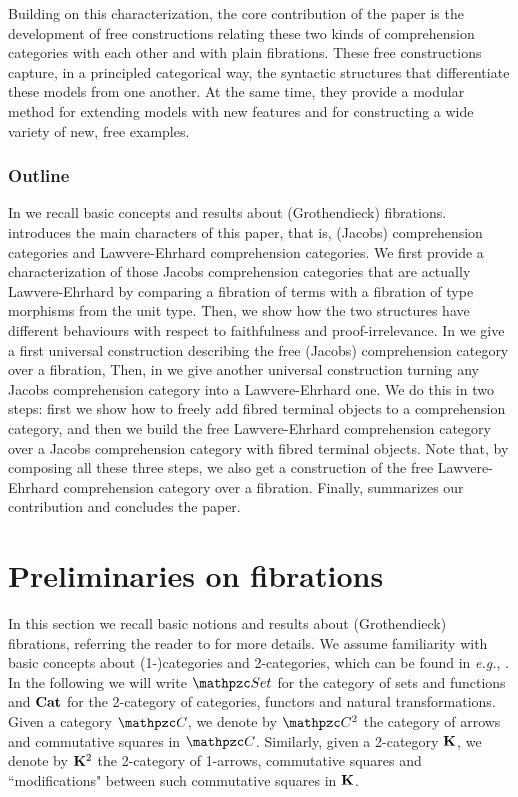 \documentclass{lmcs} %
\theoremstyle{plain}\newtheorem{satz}[thm]{Satz} %
\def\eg{{\em e.g.}}
\begin{document}
Building on this characterization, the core contribution of the paper is the development of free constructions relating these two kinds of comprehension categories with each other and with plain fibrations. These free constructions capture, in a principled categorical way, the syntactic structures that differentiate these models from one another. At the same time, they provide a modular method for extending models with new features and for constructing a wide variety of new, free examples.

\subsubsection*{Outline} 
In  we recall basic concepts and results about (Grothendieck) fibrations. 
% 
 introduces the main characters of this paper, that is, (Jacobs) comprehension categories and Lawvere-Ehrhard comprehension categories. 
We first provide a characterization of those Jacobs comprehension categories that are actually Lawvere-Ehrhard  by comparing a fibration of terms with a fibration of type morphisms from the unit type. 
Then, we show how the two structures have different behaviours with respect to faithfulness and proof-irrelevance. 
% 
In  
we give a first universal construction 
describing the free (Jacobs) comprehension category over a fibration, 
Then, in  we give another universal construction turning any Jacobs comprehension category into a Lawvere-Ehrhard one. 
We do this in two steps: 
first we show how to freely add fibred terminal objects to a comprehension category, and 
then we build the free Lawvere-Ehrhard comprehension category over a Jacobs  comprehension category with fibred terminal objects. 
Note that, 
by composing all these three steps, we also get a construction of the free Lawvere-Ehrhard comprehension category over a fibration. 
%
Finally,  summarizes our contribution and concludes the paper. 



\section{Preliminaries on fibrations}\label{sect:prelim}

In this section we recall basic notions and results about (Grothendieck) fibrations, referring the reader to \cite{StreicherT:fibc} for more details. 
We assume familiarity with basic  concepts about (1-)categories and 2-categories, which can be found  in \eg, \cite{kelly2006review, johnson20212, riehl2017category}.
In the following we will write $\ctset$ for the category of sets and functions and $\mathbf{Cat}$ for the 2-category of categories, functors and natural transformations.
Given a category $\ct{C}$, we denote by $\Arr{\ct{C}}$ the category of arrows and commutative squares in $\ct{C}$. 
Similarly, given a 2-category $\mathbf{K}$, we denote by $\mathbf{K}^{2}$ the 2-category of 1-arrows, commutative squares and ``modifications" between such commutative squares in $\mathbf{K}$.
			
\end{document}
